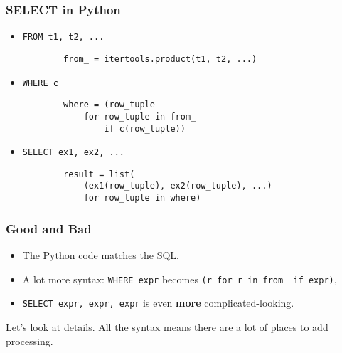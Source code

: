 \documentclass{beamer}
\begin{document}
\begin{frame}[fragile]
    \frametitle{SELECT in Python}

    \begin{itemize}
    \item[]
        \texttt{FROM t1, t2, ...}

        \begin{verbatim}
        from_ = itertools.product(t1, t2, ...)
        \end{verbatim}

        \vspace{1em}
    \item[]
        \texttt{WHERE c}

        \begin{verbatim}
        where = (row_tuple
            for row_tuple in from_
                if c(row_tuple))
        \end{verbatim}

        \vspace{1em}
    \item[]
        \texttt{SELECT ex1, ex2, ...}

        \begin{verbatim}
        result = list(
            (ex1(row_tuple), ex2(row_tuple), ...)
            for row_tuple in where)
        \end{verbatim}

    \end{itemize}

\end{frame}

\begin{frame}
    \frametitle{Good and Bad}

    \begin{itemize}
    \item The Python code matches the SQL.

    \item A lot more syntax: \texttt{WHERE expr} becomes \texttt{(r for r in from\_ if expr)},

    \item \texttt{SELECT expr, expr, expr} is even \textbf{more} complicated-looking.
    \end{itemize}

    \vspace{1em}
    Let's look at details. All the syntax means there are a lot of places to add processing.
\end{frame}
\end{document}
